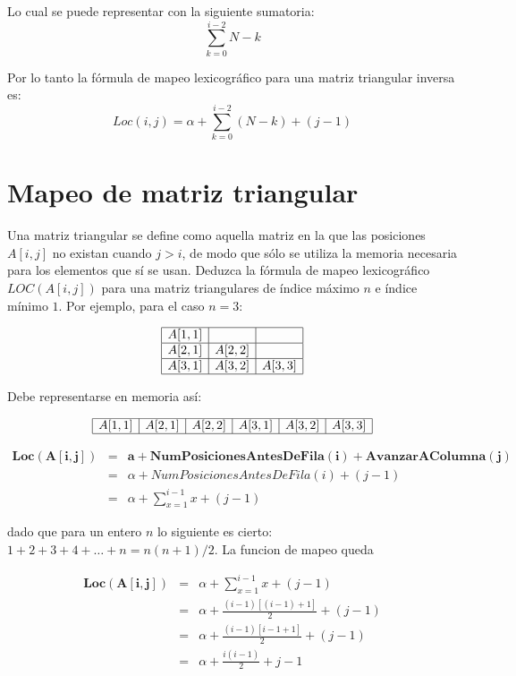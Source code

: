Lo cual se puede representar con la siguiente sumatoria:
$$\sum_{k=0}^{i-2} N-k$$

Por lo tanto la fórmula de mapeo lexicográfico para una matriz
triangular inversa es:
$$Loc(i,j)=\alpha+\sum_{k=0}^{i-2}(N-k)+(j-1)$$

\section{Mapeo de matriz triangular}
\label{sec:mapeo-de-matriz}

Una matriz triangular se define como aquella matriz en la que las
posiciones $A[i,j]$ no existan cuando $j>i$, de modo que sólo se
utiliza la memoria necesaria para los elementos que sí se
usan. Deduzca la fórmula de mapeo lexicográfico $LOC(A[i,j])$ para una
matriz triangulares de índice máximo $n$ e índice mínimo $1$. Por
ejemplo, para el caso $n=3$:

\begin{equation*}
  \label{m-triangular-inversa}
    \begin{array}{|l|l|l|}
      \hline
      A[1,1]& &\\
      \hline
      A[2,1]&A[2,2]&\\
      \hline
      A[3,1]&A[3,2]&A[3,3]\\
      \hline
    \end{array}
\end{equation*}

Debe representarse en memoria así:

\begin{equation*}
  \begin{array}{|l|l|l|l|l|l|}
    \hline
    A[1,1]&A[2,1]&A[2,2]&A[3,1]&A[3,2]&A[3,3]\\
    \hline
  \end{array}
\end{equation*}


\begin{eqnarray*}
  \mathbf{Loc(A[i,j])}&=& \mathbf{ a + NumPosicionesAntesDeFila(i)+AvanzarAColumna(j)}\\
  &=&\alpha+NumPosicionesAntesDeFila(i)+(j-1)\\
  &=&\alpha+\sum_{x=1}^{i-1}x+(j-1)
\end{eqnarray*}

dado que para un entero $n$ lo siguiente es cierto:
$1+2+3+4+\ldots+n=n(n+1)/2$. La funcion de mapeo queda

\begin{eqnarray*}
  \mathbf{Loc(A[i,j])}&=&\alpha+\sum_{x=1}^{i-1}x+(j-1)\\
  &=&\alpha+\frac{(i-1)[(i-1)+1]}{2}+(j-1)\\
  &=&\alpha+\frac{(i-1)[i-1+1]}{2}+(j-1)\\
  &=&\alpha+\frac{i(i-1)}{2}+j-1
\end{eqnarray*}



